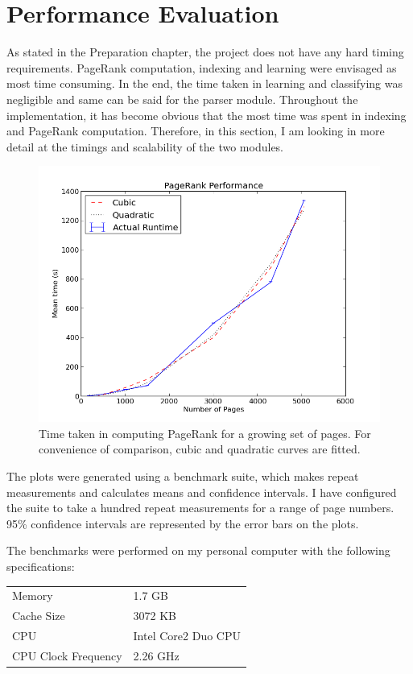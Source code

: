 \documentclass[12pt,notitlepage,twoside]{scrreprt}
\begin{document}
\section{Performance Evaluation}
As stated in the Preparation chapter, the project does not have any hard timing requirements.
PageRank computation, indexing and learning were envisaged as most time consuming. In the
end, the time taken in learning and classifying was negligible and same can be said for
the parser module.
Throughout the implementation, it has become obvious that the most time was spent in
indexing and PageRank computation. Therefore, in this section, I am looking in more detail
at the timings and scalability of the two modules.
\begin{figure}[h!]
  \centering
    \includegraphics[width=\linewidth]{figs/pr.png}
    \caption{Time taken in computing PageRank for a growing set of pages. For convenience
	    of comparison, cubic and quadratic curves are fitted.\label{pr}}
\end{figure}

The plots were generated using a benchmark suite, which makes repeat measurements and
calculates means and confidence intervals. I have configured the suite to take a hundred
repeat measurements for a range of page numbers. 95\% confidence intervals are represented by
the error bars on the plots.

The benchmarks were performed on my personal computer with the following specifications:

\begin{tabular}[h!]{l l}
Memory & 1.7 GB \\
Cache Size & 3072 KB \\
CPU & Intel Core2 Duo CPU \\
CPU Clock Frequency & 2.26 GHz \\
\end{tabular}
\end{document}
